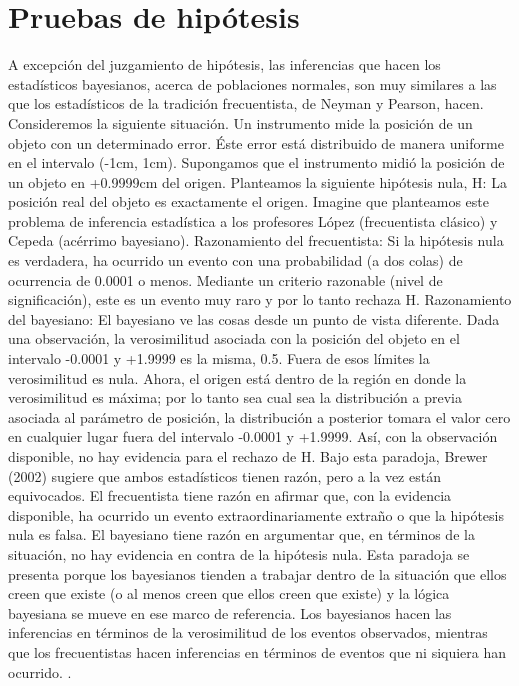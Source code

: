 \documentclass[10pt,openright]{book}\usepackage[]{graphicx}\usepackage[]{color}
\begin{document}
\section{Pruebas de hipótesis}

A excepción del juzgamiento de hipótesis, las inferencias que hacen los estadísticos bayesianos, acerca de poblaciones normales, son muy similares a las que los estadísticos de la tradición frecuentista, de Neyman y Pearson, hacen.
Consideremos la siguiente situación. Un instrumento mide la posición de un objeto con un determinado error. Éste error está distribuido de manera uniforme en el intervalo (-1cm, 1cm). Supongamos que el instrumento midió la posición de un objeto en +0.9999cm del origen. Planteamos la siguiente hipótesis nula, H: La posición real del objeto es exactamente el origen. Imagine que planteamos este problema de inferencia estadística a los profesores López (frecuentista clásico) y Cepeda (acérrimo bayesiano).
Razonamiento del frecuentista: Si la hipótesis nula es verdadera, ha ocurrido un evento con una probabilidad (a dos colas) de ocurrencia de 0.0001 o menos. Mediante un criterio razonable (nivel de significación), este es un evento muy raro y por lo tanto rechaza H.
Razonamiento del bayesiano: El bayesiano ve las cosas desde un punto de vista diferente. Dada una observación, la verosimilitud asociada con la posición del objeto en el intervalo -0.0001 y +1.9999 es la misma, 0.5. Fuera de esos límites la verosimilitud es nula. Ahora, el origen está dentro de la región en donde la verosimilitud es máxima; por lo tanto sea cual sea la distribución a previa asociada al parámetro de posición, la distribución a posterior tomara el valor cero en cualquier lugar fuera del intervalo -0.0001 y +1.9999. Así, con la observación disponible, no hay evidencia para el rechazo de H.
Bajo esta paradoja, Brewer (2002) sugiere que ambos estadísticos tienen razón, pero a la vez están equivocados. El frecuentista tiene razón en afirmar que, con la evidencia disponible, ha ocurrido un evento extraordinariamente extraño o que la hipótesis nula es falsa. El bayesiano tiene razón en argumentar que, en términos de la situación, no hay evidencia en contra de la hipótesis nula.
Esta paradoja se presenta porque los bayesianos tienden a trabajar dentro de la situación que ellos creen que existe (o al menos creen que ellos creen que existe) y la lógica bayesiana se mueve en ese marco de referencia. Los bayesianos hacen las inferencias en términos de la verosimilitud de los eventos observados, mientras que los frecuentistas hacen inferencias en términos de eventos que ni siquiera han ocurrido. .
\end{document}
